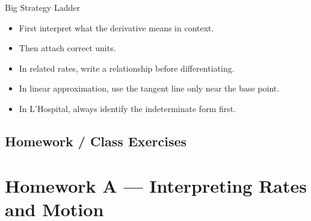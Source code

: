 \documentclass[11pt]{article}
\newcommand{\unitchapter}[1]{\newpage\subsection{#1}}
\begin{document}
\vspace{1em}

\begin{summarybox}{Big Strategy Ladder}
\begin{itemize}
    \item First interpret what the derivative means in context.
    \item Then attach correct units.
    \item In related rates, write a relationship before differentiating.
    \item In linear approximation, use the tangent line only near the base point.
    \item In L'Hospital, always identify the indeterminate form first.
\end{itemize}
\end{summarybox}

\unitchapter{Homework / Class Exercises}

\section*{Homework A --- Interpreting Rates and Motion}
\end{document}
